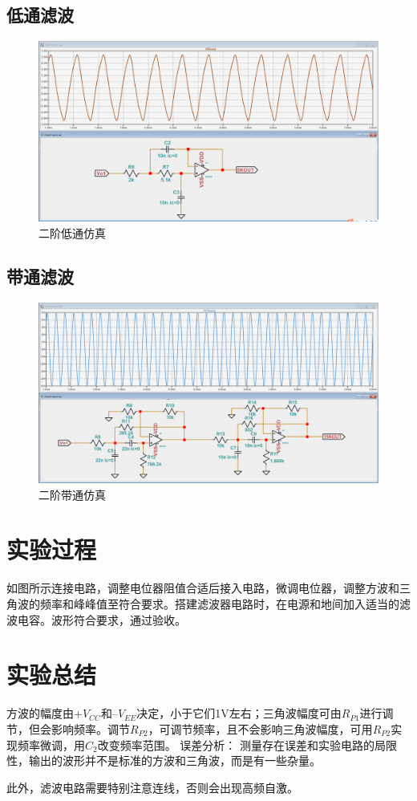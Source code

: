 \documentclass[a4paper]{article}
\theoremstyle{definition}
\theoremstyle{plain}
\theoremstyle{remark}
\begin{document}
\subsection{低通滤波}
\begin{figure}[H]
	\centering
	\includegraphics[width=1\textwidth]{二阶低通仿真}
	\caption{二阶低通仿真}
	\label{二阶低通仿真}
\end{figure}
\subsection{带通滤波}

\begin{figure}[H]
	\centering
	\includegraphics[width=1\textwidth]{二阶带通仿真.png}
	\caption{二阶带通仿真}
	\label{二阶带通仿真}
\end{figure}
\section{实验过程}
如图所示连接电路，调整电位器阻值合适后接入电路，微调电位器，调整方波和三角波的频率和峰峰值至符合要求。搭建滤波器电路时，在电源和地间加入适当的滤波电容。波形符合要求，通过验收。

\section{实验总结}
方波的幅度由$+V_{CC}$和$–V_{EE}$决定，小于它们1V左右；三角波幅度可由$R_{P1}$进行调节，但会影响频率。调节$R_{P2}$，可调节频率，且不会影响三角波幅度，可用$R_{P2}$实现频率微调，用$C_2$改变频率范围。
误差分析：
测量存在误差和实验电路的局限性，输出的波形并不是标准的方波和三角波，而是有一些杂量。

此外，滤波电路需要特别注意连线，否则会出现高频自激。

\clearpage
\appendix
{}
\end{document}
